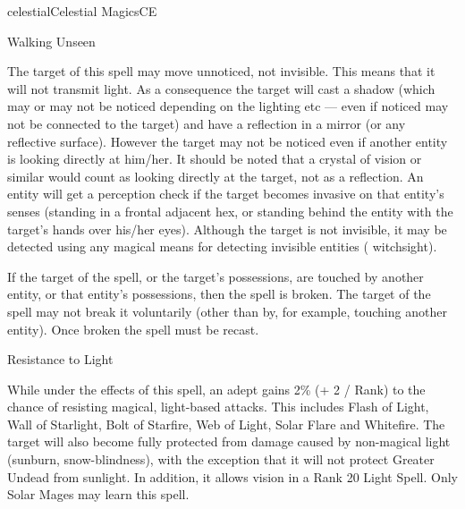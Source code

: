 \begin{college}[1.3]{celestial}{Celestial Magics}{CE}
\begin{spell}[G-8]{Walking Unseen}

\begin{effects}
The target of this spell may move unnoticed, not invisible.  This
means that it will not transmit light.  As a consequence the target
will cast a shadow (which may or may not be noticed depending on the
lighting etc --- even if noticed may not be connected to the target)
and have a reflection in a mirror (or any reflective surface).
However the target may not be noticed even if another entity is
looking directly at him/her. It should be noted that a crystal of
vision or similar would count as looking directly at the target, not
as a reflection.  An entity will get a perception check if the target
becomes invasive on that entity's senses (\eg standing in a frontal
adjacent hex, or standing behind the entity with the target's hands
over his/her eyes).  Although the target is not invisible, it may be
detected using any magical means for detecting invisible entities (\eg
witchsight).

If the target of the spell, or the target's possessions, are touched
by another entity, or that entity's possessions, then the spell is
broken.  The target of the spell may not break it voluntarily (other
than by, for example, touching another entity). Once broken the spell
must be recast.
\end{effects}
\end{spell}

\begin{spell}[G-9 Solar]{Resistance to Light}

\begin{effects}
While under the effects of this spell, an adept gains 2\% (+ 2 / Rank)
to the chance of resisting magical, light-based attacks.  This
includes Flash of Light, Wall of Starlight, Bolt of Starfire, Web of
Light, Solar Flare and Whitefire.  The target will also become fully
protected from damage caused by non-magical light (\eg sunburn,
snow-blindness), with the exception that it will not protect Greater
Undead from sunlight.  In addition, it allows vision in a Rank 20
Light Spell.  Only Solar Mages may learn this spell.
\end{effects}
\end{spell}


\end{college}

